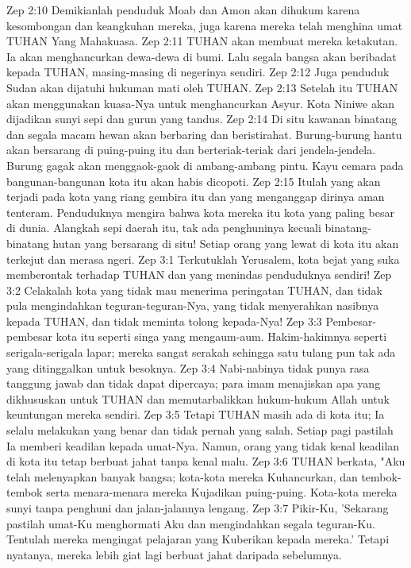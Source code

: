 Zep 2:10  Demikianlah penduduk Moab dan Amon akan dihukum karena kesombongan dan keangkuhan mereka, juga karena mereka telah menghina umat TUHAN Yang Mahakuasa.
Zep 2:11  TUHAN akan membuat mereka ketakutan. Ia akan menghancurkan dewa-dewa di bumi. Lalu segala bangsa akan beribadat kepada TUHAN, masing-masing di negerinya sendiri.
Zep 2:12  Juga penduduk Sudan akan dijatuhi hukuman mati oleh TUHAN.
Zep 2:13  Setelah itu TUHAN akan menggunakan kuasa-Nya untuk menghancurkan Asyur. Kota Niniwe akan dijadikan sunyi sepi dan gurun yang tandus.
Zep 2:14  Di situ kawanan binatang dan segala macam hewan akan berbaring dan beristirahat. Burung-burung hantu akan bersarang di puing-puing itu dan berteriak-teriak dari jendela-jendela. Burung gagak akan menggaok-gaok di ambang-ambang pintu. Kayu cemara pada bangunan-bangunan kota itu akan habis dicopoti.
Zep 2:15  Itulah yang akan terjadi pada kota yang riang gembira itu dan yang menganggap dirinya aman tenteram. Penduduknya mengira bahwa kota mereka itu kota yang paling besar di dunia. Alangkah sepi daerah itu, tak ada penghuninya kecuali binatang-binatang hutan yang bersarang di situ! Setiap orang yang lewat di kota itu akan terkejut dan merasa ngeri.
Zep 3:1  Terkutuklah Yerusalem, kota bejat yang suka memberontak terhadap TUHAN dan yang menindas penduduknya sendiri!
Zep 3:2  Celakalah kota yang tidak mau menerima peringatan TUHAN, dan tidak pula mengindahkan teguran-teguran-Nya, yang tidak menyerahkan nasibnya kepada TUHAN, dan tidak meminta tolong kepada-Nya!
Zep 3:3  Pembesar-pembesar kota itu seperti singa yang mengaum-aum. Hakim-hakimnya seperti serigala-serigala lapar; mereka sangat serakah sehingga satu tulang pun tak ada yang ditinggalkan untuk besoknya.
Zep 3:4  Nabi-nabinya tidak punya rasa tanggung jawab dan tidak dapat dipercaya; para imam menajiskan apa yang dikhususkan untuk TUHAN dan memutarbalikkan hukum-hukum Allah untuk keuntungan mereka sendiri.
Zep 3:5  Tetapi TUHAN masih ada di kota itu; Ia selalu melakukan yang benar dan tidak pernah yang salah. Setiap pagi pastilah Ia memberi keadilan kepada umat-Nya. Namun, orang yang tidak kenal keadilan di kota itu tetap berbuat jahat tanpa kenal malu.
Zep 3:6  TUHAN berkata, "Aku telah melenyapkan banyak bangsa; kota-kota mereka Kuhancurkan, dan tembok-tembok serta menara-menara mereka Kujadikan puing-puing. Kota-kota mereka sunyi tanpa penghuni dan jalan-jalannya lengang.
Zep 3:7  Pikir-Ku, 'Sekarang pastilah umat-Ku menghormati Aku dan mengindahkan segala teguran-Ku. Tentulah mereka mengingat pelajaran yang Kuberikan kepada mereka.' Tetapi nyatanya, mereka lebih giat lagi berbuat jahat daripada sebelumnya.
